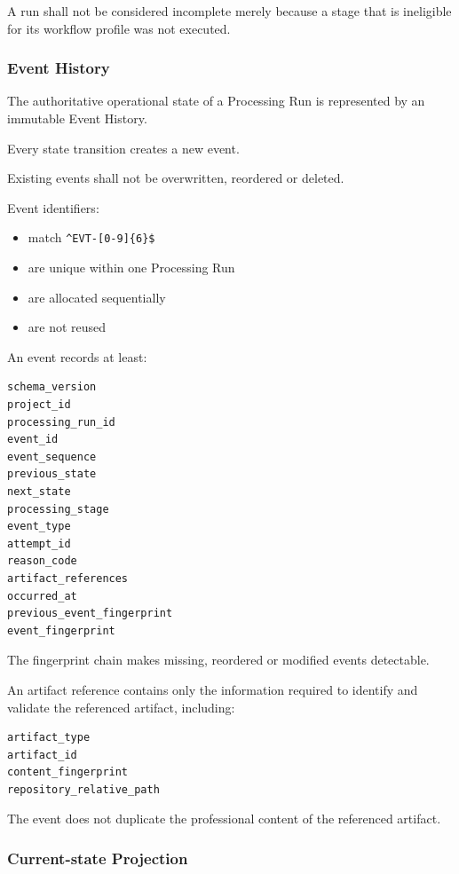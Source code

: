 A run shall not be considered incomplete merely because a stage that is ineligible for its workflow profile was not executed.

\hypertarget{event-history}{%
\subsubsection{Event History}\label{event-history}}

The authoritative operational state of a Processing Run is represented by an immutable Event History.

Every state transition creates a new event.

Existing events shall not be overwritten, reordered or deleted.

Event identifiers:

\begin{itemize}
\tightlist
\item
  match \texttt{\^{}EVT-{[}0-9{]}\{6\}\$}
\item
  are unique within one Processing Run
\item
  are allocated sequentially
\item
  are not reused
\end{itemize}

An event records at least:

\begin{verbatim}
schema_version
project_id
processing_run_id
event_id
event_sequence
previous_state
next_state
processing_stage
event_type
attempt_id
reason_code
artifact_references
occurred_at
previous_event_fingerprint
event_fingerprint
\end{verbatim}

The fingerprint chain makes missing, reordered or modified events detectable.

An artifact reference contains only the information required to identify and validate the referenced artifact, including:

\begin{verbatim}
artifact_type
artifact_id
content_fingerprint
repository_relative_path
\end{verbatim}

The event does not duplicate the professional content of the referenced artifact.

\hypertarget{current-state-projection}{%
\subsubsection{Current-state Projection}\label{current-state-projection}}

